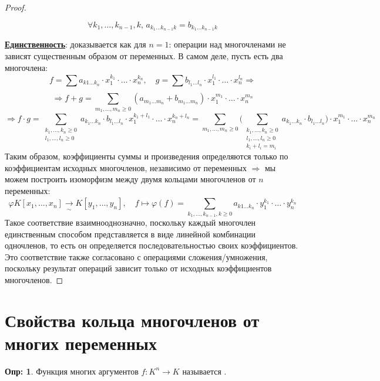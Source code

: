 \documentclass[12pt]{article}
\theoremstyle{definition}
\newtheorem{defn}{Опр:}
\newcommand{\ddsum}[2]{\displaystyle\sum\limits_{#1}^{#2}}
\begin{document}
\begin{proof}
\begin{enumerate}[label=\arabic*)]
		$$
			\forall k_1, \dotsc, k_{n-1}, k, \, a_{k_1\dotsc k_{n-1}k} = b_{k_1\dotsc k_{n-1}k}
		$$
	\end{enumerate}
	\textbf{\uline{Единственность}}: доказывается как для $n = 1$: операции над многочленами не зависят существенным образом от переменных. В самом деле, пусть есть два многочлена:
	$$
		f = \ddsum{}{}a_{k1\dotsc k_n}{\cdot}x_1^{k_1}{\cdot}\dotsc{\cdot}x_n^{k_n}, \quad g = \ddsum{}{}b_{l_1\dotsc l_n}{\cdot}x_1^{l_1}{\cdot}\dotsc{\cdot}x_n^{l_n} \Rightarrow
	$$
	$$
		\Rightarrow f + g = \ddsum{m_1,\dotsc,m_n \geq 0}{}(a_{m_1\dotsc m_n} + b_{m_1\dotsc m_n}){\cdot}x_1^{m_1}{\cdot}\dotsc{\cdot}x_n^{m_n}
	$$
	$$
		\Rightarrow f{\cdot}g = \ddsum{\substack{k_1,\dotsc,k_n \geq 0\\l_1,\dotsc,l_n \geq 0}}{}a_{k_1\dotsc k_n}{\cdot}b_{l_1\dotsc l_n}{\cdot}x_1^{k_1 + l_1}{\cdot}\dotsc{\cdot}x_n^{k_n + l_n} = \ddsum{m_1,\dotsc,m_n \geq 0}{}\bigg(\ddsum{\substack{k_1,\dotsc,k_n \geq 0\\l_1,\dotsc,l_n \geq 0\\ k_i + l_i = m_i}}{} a_{k_1\dotsc k_n}{\cdot}b_{l_1\dotsc l_n}\bigg) {\cdot}x_1^{m_1}{\cdot}\dotsc{\cdot}x_n^{m_n}
	$$
	Таким образом, коэффициенты суммы и произведения определяются только по коэффициентам исходных многочленов, независимо от переменных $\Rightarrow$ мы можем построить изоморфизм между двумя кольцами многочленов от $n$ переменных:
	$$
		\varphi K[x_1,\dotsc,x_n] \xrightarrow[\sim]{} K[y_1,\dotsc, y_n], \quad f  \mapsto \varphi(f) = \ddsum{k_1,\dotsc,k_{n-1},k \geq 0}{}a_{k1\dotsc k_n}{\cdot}y_1^{k_1}{\cdot}\dotsc{\cdot}y_n^{k_n}
	$$
	Такое соответствие взаимнооднозначно, поскольку каждый многочлен единственным способом представляется в виде линейной комбинации одночленов, то есть он определяется последовательностью своих коэффициентов. Это соответствие также согласовано с операциями сложения/умножения, поскольку результат операций зависит только от исходных коэффициентов многочленов.
\end{proof}

\newpage
\section*{Свойства кольца многочленов от многих переменных}
\begin{defn}
	Функция многих аргументов $f \colon K^n \to K$ называется .
\end{defn}
\end{document}
